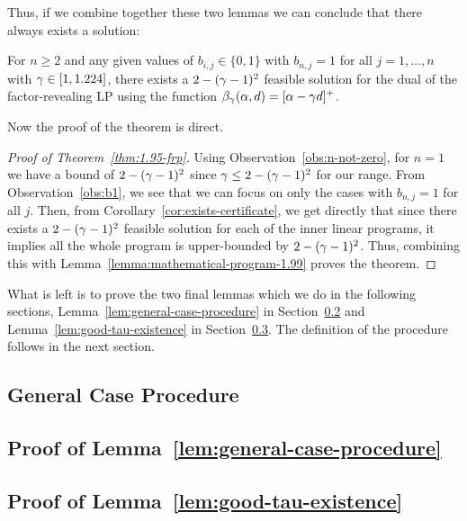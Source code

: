 Thus, if we combine together these two lemmas we can conclude that there always exists a solution:

\begin{corollary}\label{cor:exists-certificate}
    For $n \geq 2$ and any given values of $b_{i,j}\in\{0,1\}$ with $b_{n,j} = 1$ for all $j = 1, \ldots, n$ with $\gamma\in[1,1.224]$, there exists a $2-(\gamma-1)^2$ feasible solution for the dual of the factor-revealing LP using the function $\beta_{\gamma}(\alpha,d) = [\alpha - \gamma d]^{+}$.
\end{corollary}

Now the proof of the theorem is direct.

\begin{proof}[Proof of Theorem~\ref{thm:1.95-frp}]
    Using Observation~\ref{obs:n-not-zero}, for $n=1$ we have a bound of $2-(\gamma-1)^2$ since $\gamma\leq 2-(\gamma-1)^2$ for our range. From Observation~\ref{obs:b1}, we see that we can focus on only the cases with $b_{n,j}=1$ for all $j$. Then, from Corollary~\ref{cor:exists-certificate}, we get directly that since there exists a $2-(\gamma-1)^2$ feasible solution for each of the inner linear programs, it implies all the whole program is upper-bounded by $2-(\gamma-1)^2$. Thus, combining this with Lemma~\ref{lemma:mathematical-program-1.99} proves the theorem.
\end{proof}

What is left is to prove the two final lemmas which we do in the following sections, Lemma~\ref{lem:general-case-procedure} in Section~\ref{sec:general-case-proof} and Lemma~\ref{lem:good-tau-existence} in Section~\ref{sec:good-aux-existence}. The definition of the procedure follows in the next section.

\subsection{General Case Procedure}\label{sec:general-case-procedure}


\subsection{Proof of Lemma~\ref{lem:general-case-procedure}}\label{sec:general-case-proof}



\newpage
\subsection{Proof of Lemma~\ref{lem:good-tau-existence}}\label{sec:good-aux-existence}


